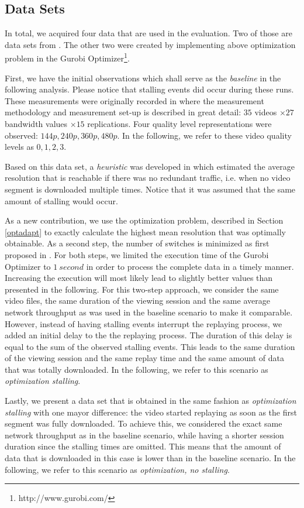 
\subsection{Data Sets}

In total, we acquired four data that are used in the evaluation. Two of those are data sets from \cite{sieber16sacrificing}. The other two were created by implementing above optimization problem in the Gurobi Optimizer\footnote{http://www.gurobi.com/}.

First, we have the initial observations which shall serve as the \textit{baseline} in the following analysis. Please notice that stalling events did occur during these runs. These measurements were originally recorded in \cite{sieber16sacrificing} where the measurement methodology and measurement set-up is described in great detail: $35$ videos $\times 27$ bandwidth values $\times 15$ replications. Four quality level representations were observed: $144p, 240p, 360p, 480p$. In the following, we refer to these video quality levels as $0,1,2,3$.

Based on this data set, a \textit{heuristic} was developed in \cite{sieber16sacrificing} which estimated the average resolution that is reachable if there was no redundant traffic, i.e. when no video segment is downloaded multiple times. Notice that it was assumed that the same amount of stalling would occur.

As a new contribution, we use the optimization problem, described in Section \ref{optadapt} to exactly calculate the highest mean resolution that was optimally obtainable. As a second step, the number of switches is minimized as first proposed in \cite{miller2013optimal}. For both steps, we limited the execution time of the Gurobi Optimizer to $\SI{1}{second}$ in order to process the complete data in a timely manner. Increasing the execution will most likely lead to slightly better values than presented in the following. For this two-step approach, we consider the same video files, the same duration of the viewing session and the same average network throughput as was used in the baseline scenario to make it comparable. However, instead of having stalling events interrupt the replaying process, we added an initial delay to the the replaying process. The duration of this delay is equal to the sum of the observed stalling events. This leads to the same duration of the viewing session and the same replay time and the same amount of data that was totally downloaded. In the following, we refer to this scenario as \textit{optimization stalling}.

Lastly, we present a data set that is obtained in the same fashion as \textit{optimization stalling} with one mayor difference: the video started replaying as soon as the first segment was fully downloaded. To achieve this, we considered the exact same network throughput as in the baseline scenario, while having a shorter session duration since the stalling times are omitted. This means that the amount of data that is downloaded in this case is lower than in the baseline scenario. In the following, we refer to this scenario as \textit{optimization, no stalling}.
